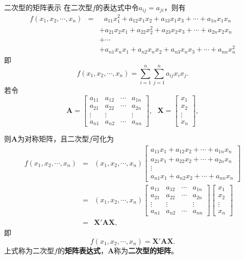\documentclass[compress,mathserif,cjk]{beamer}
\theoremstyle{remark}
\numberwithin{equation}{section}
\newcommand{\hei}{\bf}      %
\begin{document}
\begin{CJK}{UTF8}{gbsn}
\begin{frame}{二次型的矩阵表示}\small
 在二次型$f$的表达式中令$a_{ij}=a_{ji}$，则有
 \begin{eqnarray*}
 f(x_1,x_2,\cdots,x_n)&=&~~~a_{11}x_1^2+a_{12}x_1x_2+a_{13}x_1x_3+\cdots+a_{1n}x_1x_n\\
 &&+a_{21}x_2x_1+a_{22}x_2^2+a_{23}x_2x_3+\cdots+a_{2n}x_2x_n\\
 &&+\cdots\\
 &&+a_{n1}x_nx_1+a_{n2}x_nx_2+a_{n3}x_nx_3+\cdots+a_{nn}x_n^2
 \end{eqnarray*}
 即
 $$f(x_1,x_2,\cdots,x_n)=\sum_{i=1}^n\sum_{j=1}^na_{ij}x_ix_j.$$
 \pause 若令
 $$\bm A=\left[\begin{matrix}a_{11}&a_{12}&\cdots&a_{1n}\\a_{21}&a_{22}&\cdots&a_{2n}\\\vdots&\vdots&&\vdots\\a_{n1}&a_{n2}&\cdots&a_{nn}\end{matrix}\right],~~~
 \bm X=\left[\begin{matrix}x_1\\x_2\\\vdots\\x_n\end{matrix}\right],$$
 \end{frame}

\begin{frame}\small
则$\bm A$为对称矩阵，且二次型$f$可化为
\begin{eqnarray*}
 f(x_1,x_2,\cdots,x_n)&=&(x_1,x_2,\cdots,x_n)\left[\begin{matrix}a_{11}x_1+a_{12}x_2+\cdots+a_{1n}x_n\\a_{21}x_1+a_{22}x_2+\cdots+a_{2n}x_n\\\vdots\\
 a_{n1}x_1+a_{n2}x_2+\cdots+a_{nn}x_n\end{matrix}\right]\\
 &=&(x_1,x_2,\cdots,x_n)\left[\begin{matrix}a_{11}&a_{12}&\cdots&a_{1n}\\a_{21}&a_{22}&\cdots&a_{2n}\\\vdots&\vdots&&\vdots\\a_{n1}&a_{n2}&\cdots&a_{nn}\end{matrix}\right]
 \left[\begin{matrix}x_1\\x_2\\\vdots\\x_n\end{matrix}\right]\\
 &=&\bm X'\bm{AX},
\end{eqnarray*}
即
$$f(x_1,x_2,\cdots,x_n)=\bm X'\bm{AX}.$$
上式称为二次型$f$的{\hei 矩阵表达式}，$\bm A$称为{\hei 二次型的矩阵}。
\end{frame}


\end{CJK}
\end{document}
